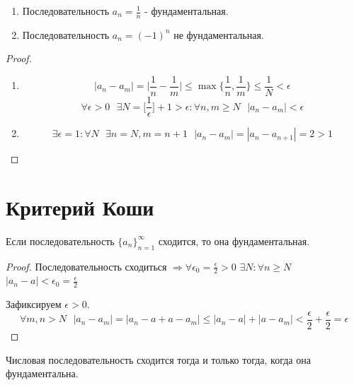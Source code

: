 	\begin{example}
		\begin{enumerate}
			\item Последовательность $a_n = \frac{1}{n}$ - фундаментальная.
			\item Последовательность $a_n = (-1)^n$ не фундаментальная.
		\end{enumerate}
	\end{example}
	
	\begin{proof}
		\begin{enumerate}
			\item \[ |a_n - a_m| = \bigg|\frac{1}{n} - \frac{1}{m}\bigg| \leqslant \max\bigg\{\frac{1}{n}, \frac{1}{m}\bigg\} \leqslant \frac{1}{N} < \epsilon \]
			\[ \forall \epsilon > 0 \text{ } \exists N = \bigg[\frac{1}{\epsilon}\bigg] + 1 > \epsilon: \forall n, m \geqslant N \text{ } |a_n - a_m| < \epsilon \]
			\item \[ \exists \epsilon = 1: \forall N \text{ } \exists n = N, m = n + 1 \text{ } |a_n - a_m| = |a_n - a_{n + 1}| = 2 > 1 \]			
		\end{enumerate}
	\end{proof}
	
	\section{Критерий Коши}
	
	\begin{sentence}
		Если последовательность $\{a_n\}^{\infty}_{n = 1}$ сходится, то она  фундаментальная.
	\end{sentence}
	
	\begin{proof}
		Последовательность сходиться $\Rightarrow \forall \epsilon_0 = \frac{\epsilon}{2} > 0$ $\exists N: \forall n \geqslant N$ $|a_n - a| < \epsilon_0 = \frac{\epsilon}{2}$
	     
	    Зафиксируем $\epsilon > 0$.
	    \[ \forall m, n > N \text{ } |a_n - a_m| = |a_n - a + a - a_m| \leqslant |a_n - a| + |a - a_m| < \frac{\epsilon}{2} + \frac{\epsilon}{2} = \epsilon \]
	\end{proof}
	
	\begin{theorem}
		Числовая последовательность сходится тогда и только тогда, когда она фундаментальна.
	\end{theorem}
	
